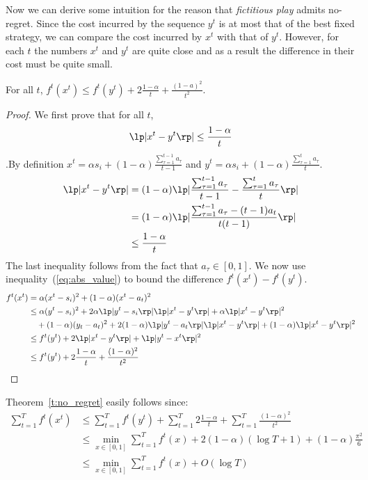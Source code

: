 Now we can derive some intuition for the reason that \emph{fictitious play} admits
no-regret. Since the cost incurred by the sequence $y^t$ is at most that of the best
fixed strategy, we can compare the cost incurred by $x^t$ with that of $y^t$.
However, for each $t$ the numbers $x^t$ and $y^t$ are quite close and as a result
the difference in their cost must be quite small.

\begin{lemma}
  For all $t$, $f^t(x^t) \leq f^t(y^t) + 2\frac{1-\alpha}{t} + \frac{(1-a)^2}{t^2}$.
\end{lemma}
\begin{proof}
  We first prove that for all $t$,
  \begin{equation}\label{eq:abs_value}
  	\lp|x^t - y^t \rp| \leq \frac{1-\alpha}{t}
  \end{equation}
  .By definition $x^t = \alpha s_i + (1-\alpha)\frac{\sum_{\tau = 1}^{t-1} a_\tau}{t-1}$
  and $ y^t = \alpha s_i + (1-\alpha)\frac{\sum_{\tau = 1}^t a_\tau}{t}$.
  \begin{align*}
    \lp|x^t - y^t\rp|
    &=
    (1-\alpha)\lp|\frac{\sum_{\tau = 1}^{t-1}a_\tau}{t-1}
    - \frac{\sum_{\tau = 1}^t a_\tau}{t}\rp|\\
    &=
    (1-\alpha)\lp|\frac{\sum_{\tau = 1}^{t-1}a_\tau -(t-1)a_t}{t(t-1)}\rp|\\
    &\leq
    \frac{1-\alpha}{t}
  \end{align*}
  The last inequality follows from the fact that $a_\tau \in [0,1]$.
  We now use inequality~(\ref{eq:abs_value}) to bound the difference $f^t(x^t) - f^t(y^t)$.
  \begin{align*}
    f^t(x^t)
    &=
    \alpha(x^t - s_i)^2 + (1 - \alpha)(x^t - a_t)^2 \\
    &\leq
    \alpha(y^t - s_i)^2 + 2\alpha\lp|y^t -
    s_i\rp|\lp|x^t - y^t\rp| + \alpha \lp|x^t - y^t\rp|^2 \\
    &\quad + (1-\alpha)(y_t - a_t)^2 +
    2(1-\alpha)\lp|y^t - a_t\rp|\lp|x^t-y^t\rp| + (1 - \alpha)\lp|x^t - y^t\rp|^2\\
    &\leq
    f^t(y^t) + 2\lp|x^t - y^t\rp| + \lp|y^t - x^t\rp|^2\\
    &\leq
    f^t(y^t) + 2\frac{1-\alpha}{t} + \frac{(1-\alpha)^2}{t^2}
  \end{align*}
\end{proof}

Theorem~\ref{t:no_regret} easily follows since:
\begin{align*}
  \sum_{t=1}^T f^t(x^t)
  &\leq
  \sum_{t=1}^T f^t(y^t) + \sum_{t=1}^T 2\frac{1-\alpha}{t} +
  \sum_{t=1}^T \frac{(1-\alpha)^2}{t^2}\\
  &\leq
  \min_{x \in [0,1]} \sum_{t=1}^T f^t(x) +
  2(1-\alpha)(\log T + 1) + (1-\alpha)\frac{\pi^2}{6}\\
  &\leq
  \min_{x \in [0,1]} \sum_{t=1}^T f^t(x) + O(\log T)
\end{align*}

